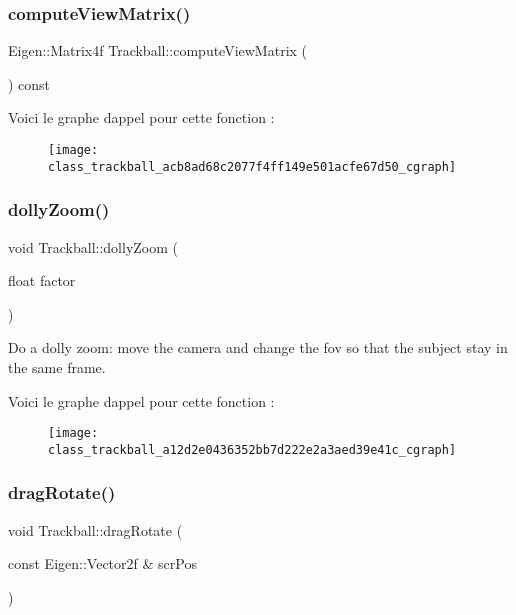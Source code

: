 \subsubsection{\texorpdfstring{compute\+View\+Matrix()}{computeViewMatrix()}}
{\footnotesize\ttfamily Eigen\+::\+Matrix4f Trackball\+::compute\+View\+Matrix (\begin{DoxyParamCaption}{ }\end{DoxyParamCaption}) const}

Voici le graphe d\textquotesingle{}appel pour cette fonction \+:\nopagebreak
\begin{figure}[H]
\begin{center}
\leavevmode
\texttt{[image: class\_trackball\_acb8ad68c2077f4ff149e501acfe67d50\_cgraph]}
\end{center}
\end{figure}
\mbox{\label{class_trackball_a12d2e0436352bb7d222e2a3aed39e41c}} 
\subsubsection{\texorpdfstring{dolly\+Zoom()}{dollyZoom()}}
{\footnotesize\ttfamily void Trackball\+::dolly\+Zoom (\begin{DoxyParamCaption}\item[{float}]{factor }\end{DoxyParamCaption})}



Do a dolly zoom\+: move the camera and change the fov so that the subject stay in the same frame. 

Voici le graphe d\textquotesingle{}appel pour cette fonction \+:\nopagebreak
\begin{figure}[H]
\begin{center}
\leavevmode
\texttt{[image: class\_trackball\_a12d2e0436352bb7d222e2a3aed39e41c\_cgraph]}
\end{center}
\end{figure}
\mbox{\label{class_trackball_a1dcd5aef16fd43aabfc0099183202437}} 
\subsubsection{\texorpdfstring{drag\+Rotate()}{dragRotate()}}
{\footnotesize\ttfamily void Trackball\+::drag\+Rotate (\begin{DoxyParamCaption}\item[{const Eigen\+::\+Vector2f \&}]{scr\+Pos }\end{DoxyParamCaption})}

